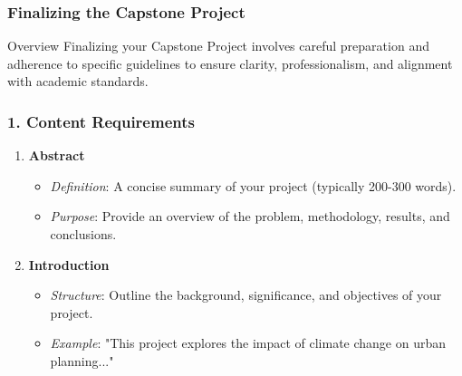 \documentclass[aspectratio=169]{beamer}
\begin{document}
\begin{frame}[fragile]
    \frametitle{Finalizing the Capstone Project}
    \begin{block}{Overview}
        Finalizing your Capstone Project involves careful preparation and adherence to specific guidelines to ensure clarity, professionalism, and alignment with academic standards.
    \end{block}
\end{frame}

\begin{frame}[fragile]
    \frametitle{1. Content Requirements}
    
    \begin{enumerate}
        \item \textbf{Abstract}
        \begin{itemize}
            \item \textit{Definition}: A concise summary of your project (typically 200-300 words).
            \item \textit{Purpose}: Provide an overview of the problem, methodology, results, and conclusions.
        \end{itemize}
        
        \item \textbf{Introduction}
        \begin{itemize}
            \item \textit{Structure}: Outline the background, significance, and objectives of your project.
            \item \textit{Example}: "This project explores the impact of climate change on urban planning..."
        \end{itemize}
    \end{enumerate}
\end{frame}
\end{document}
